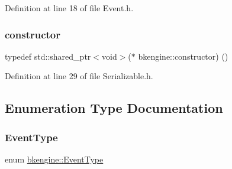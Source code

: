 Definition at line 18 of file Event.\+h.

\mbox{\label{namespacebkengine_acd14584baee16a048e3d8ec97780af46}} 
\subsubsection{\texorpdfstring{constructor}{constructor}}
{\footnotesize\ttfamily typedef std\+::shared\+\_\+ptr$<$void$>$($\ast$ bkengine\+::constructor) ()}



Definition at line 29 of file Serializable.\+h.



\subsection{Enumeration Type Documentation}
\mbox{\label{namespacebkengine_a3e5e03aeca2071b818e61f66670f6056}} 
\subsubsection{\texorpdfstring{Event\+Type}{EventType}}
{\footnotesize\ttfamily enum \hyperlink{namespacebkengine_a3e5e03aeca2071b818e61f66670f6056}{bkengine\+::\+Event\+Type}\hspace{0.3cm}{\ttfamily [strong]}}

